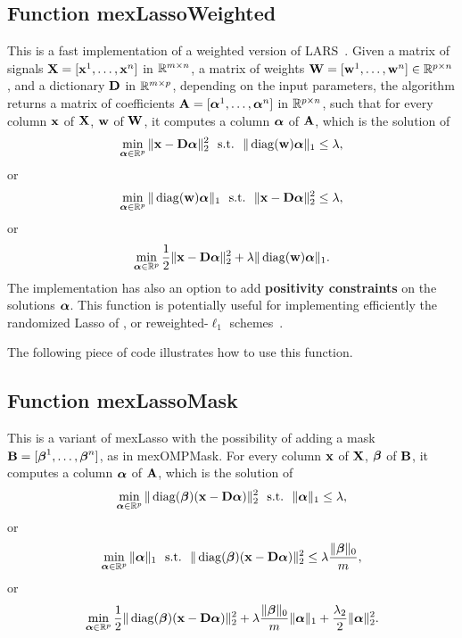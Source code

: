 \documentclass[a4paper, 11pt]{article}
\begin{document}
\subsection{Function mexLassoWeighted}
This is a fast implementation of a weighted version of LARS~\cite{efron}. Given a matrix of signals ${\mathbf X}=[{\mathbf x}^1,\ldots,{\mathbf x}^n]$  in ${\mathbb R}^{m \times n}$, a matrix of weights ${\mathbf W}=[{\mathbf w}^1,\ldots,{\mathbf w}^n] \in {\mathbb R}^{p \times n}$, and a dictionary ${\mathbf D}$ in ${\mathbb R}^{m \times p}$, depending on the input parameters, the algorithm returns a matrix of coefficients ${\mathbf A}=[{\boldsymbol\alpha}^1,\ldots,{\boldsymbol\alpha}^n]$ in ${\mathbb R}^{p \times n}$,
     such that for every column ${\mathbf x}$ of ${\mathbf X}$, ${\mathbf w}$ of ${\mathbf W}$, it computes a column ${\boldsymbol\alpha}$ of ${\mathbf A}$,  which is the solution of
     \begin{equation}
     \min_{{\boldsymbol\alpha} \in {\mathbb R}^p} \|{\mathbf x}-{\mathbf D}{\boldsymbol\alpha}\|_2^2 ~~\text{s.t.}~~ \|\operatorname{diag}({\mathbf w}){\boldsymbol\alpha}\|_1 \leq \lambda,
     \end{equation}
     or
     \begin{equation}
     \min_{{\boldsymbol\alpha} \in {\mathbb R}^p}  \|\operatorname{diag}({\mathbf w}){\boldsymbol\alpha}\|_1 ~~\text{s.t.}~~ \|{\mathbf x}-{\mathbf D}{\boldsymbol\alpha}\|_2^2 \leq \lambda,
     \end{equation}
     or
     \begin{equation}
     \min_{{\boldsymbol\alpha} \in {\mathbb R}^p} \frac{1}{2}\|{\mathbf x}-{\mathbf D}{\boldsymbol\alpha}\|_2^2 + \lambda \|\operatorname{diag}({\mathbf w}){\boldsymbol\alpha}\|_1.
     \end{equation}
     The implementation has also an option to add {\bf positivity constraints} on
     the solutions ${\boldsymbol\alpha}$.  This function is potentially useful for
     implementing efficiently the randomized Lasso of \cite{meinshausen}, or reweighted-$\ell_1$ schemes~\cite{candes4}.


The following piece of code illustrates how to use this function.



\subsection{Function mexLassoMask}
This is a variant of mexLasso with the possibility of adding a mask ${\mathbf B}=[{\boldsymbol\beta}^1,\ldots,{\boldsymbol\beta}^n]$, as in mexOMPMask.
For every column ${\mathbf x}$ of ${\mathbf X}$, ${\boldsymbol\beta}$ of ${\mathbf B}$, it computes a column ${\boldsymbol\alpha}$ of ${\mathbf A}$,  which is the solution of
\begin{equation}
\min_{{\boldsymbol\alpha} \in {\mathbb R}^p} \|\operatorname{diag}({\boldsymbol\beta})({\mathbf x}-{\mathbf D}{\boldsymbol\alpha})\|_2^2 ~~\text{s.t.}~~ \|{\boldsymbol\alpha}\|_1 \leq \lambda,
   \end{equation}
   or
   \begin{equation}
   \min_{{\boldsymbol\alpha} \in {\mathbb R}^p}  \|{\boldsymbol\alpha}\|_1 ~~\text{s.t.}~~ \|\operatorname{diag}({\boldsymbol\beta})({\mathbf x}-{\mathbf D}{\boldsymbol\alpha})\|_2^2 \leq \lambda\frac{\|{\boldsymbol\beta}\|_0}{m},
   \end{equation}
   or
   \begin{equation}
   \min_{{\boldsymbol\alpha} \in {\mathbb R}^p} \frac{1}{2}\|\operatorname{diag}({\boldsymbol\beta})({\mathbf x}-{\mathbf D}{\boldsymbol\alpha})\|_2^2 + \lambda \frac{\|{\boldsymbol\beta}\|_0}{m}\|{\boldsymbol\alpha}\|_1 + \frac{\lambda_2}{2}\|{\boldsymbol\alpha}\|_2^2.
   \end{equation}
\end{document}
